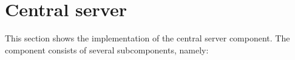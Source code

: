\section {Central server}
\label {sec:implserver}

This section shows the implementation of the central server component. The component consists of several subcomponents, namely:
